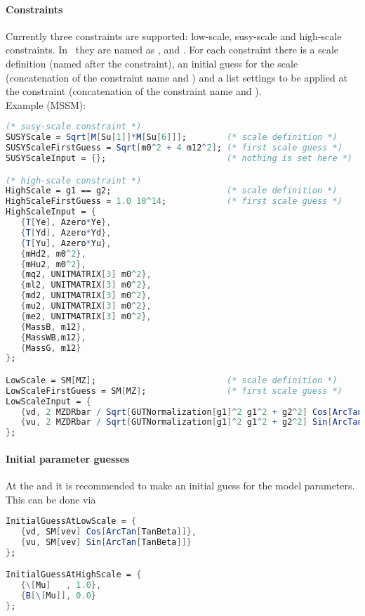 \paragraph{Constraints}
Currently three constraints are supported: low-scale, susy-scale and
high-scale constraints.  In \flexisusy\ they are named as
,  and .  For
each constraint there is a scale definition (named after the
constraint), an initial guess for the scale (concatenation of the
constraint name and ) and a list settings to be
applied at the constraint (concatenation of the constraint name and
).
\\
Example (MSSM):
\begin{lstlisting}[language=Mathematica]
(* susy-scale constraint *)
SUSYScale = Sqrt[M[Su[1]]*M[Su[6]]];        (* scale definition *)
SUSYScaleFirstGuess = Sqrt[m0^2 + 4 m12^2]; (* first scale guess *)
SUSYScaleInput = {};                        (* nothing is set here *)

(* high-scale constraint *)
HighScale = g1 == g2;                       (* scale definition *)
HighScaleFirstGuess = 1.0 10^14;            (* first scale guess *)
HighScaleInput = {
   {T[Ye], Azero*Ye},
   {T[Yd], Azero*Yd},
   {T[Yu], Azero*Yu},
   {mHd2, m0^2},
   {mHu2, m0^2},
   {mq2, UNITMATRIX[3] m0^2},
   {ml2, UNITMATRIX[3] m0^2},
   {md2, UNITMATRIX[3] m0^2},
   {mu2, UNITMATRIX[3] m0^2},
   {me2, UNITMATRIX[3] m0^2},
   {MassB, m12},
   {MassWB,m12},
   {MassG, m12}
};

LowScale = SM[MZ];                          (* scale definition *)
LowScaleFirstGuess = SM[MZ];                (* first scale guess *)
LowScaleInput = {
   {vd, 2 MZDRbar / Sqrt[GUTNormalization[g1]^2 g1^2 + g2^2] Cos[ArcTan[TanBeta]]},
   {vu, 2 MZDRbar / Sqrt[GUTNormalization[g1]^2 g1^2 + g2^2] Sin[ArcTan[TanBeta]]}
};
\end{lstlisting}

\paragraph{Initial parameter guesses} At the  and
 it is recommended to make an initial guess for the
model parameters.  This can be done via
\begin{lstlisting}[language=Mathematica]
InitialGuessAtLowScale = {
   {vd, SM[vev] Cos[ArcTan[TanBeta]]},
   {vu, SM[vev] Sin[ArcTan[TanBeta]]}
};

InitialGuessAtHighScale = {
   {\[Mu]   , 1.0},
   {B[\[Mu]], 0.0}
};
\end{lstlisting}

